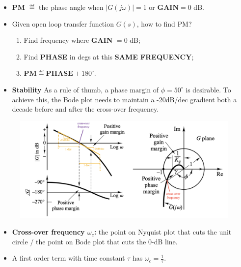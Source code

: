 \begin{itemize}
    \item \textbf{PM} $\eqdef$ the phase angle when $|G(j\omega)|=1$ or $\textbf{GAIN} =0$ dB.  
    \item Given open loop transfer function $G(s)$, how to find PM?
    \begin{enumerate}
        \item Find frequency where \textbf{GAIN} $=0$ dB;
        \item Find \textbf{PHASE} in degs at this \textbf{SAME FREQUENCY};
        \item $\textbf{PM}\eqdef \textbf{PHASE} +180^{\circ}$.
    \end{enumerate}
    \item \textbf{Stability} As a rule of thumb, a phase margin of $\phi = 50^{\circ}$ is desirable. To achieve this, the Bode plot needs to maintain a -20dB/dec gradient both a decade before and after the cross-over frequency.
\end{itemize}
\begin{figure}[H]
    \centering
    \includegraphics[width=1.0\linewidth]{images/phase_margin.png}
\end{figure}

\begin{itemize}
    \item \textbf{Cross-over frequency $\omega_c$:} the point on Nyquist plot that cuts the unit circle / the point on Bode plot that cuts the 0-dB line.
    \item A first order term with time constant $\tau$ has $\omega_c = \frac{1}{\tau}$.
\end{itemize}

